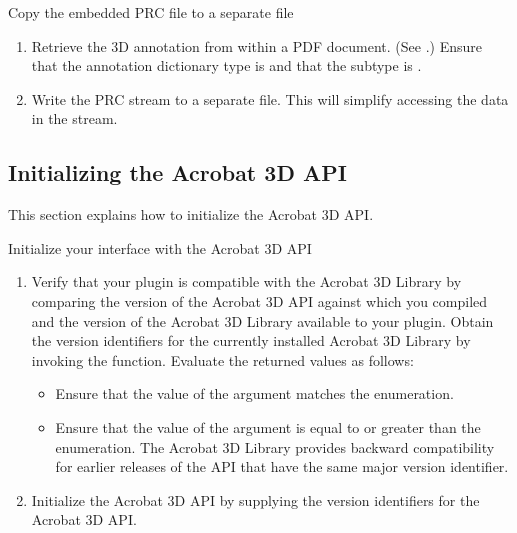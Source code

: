 \documentclass[letterpaper,12pt,english,openany,oneside]{sphinxmanual}
\begin{document}
Copy the embedded PRC file to a separate file
\begin{enumerate}
%
\item {} 
Retrieve the 3D annotation from within a PDF document. (See .) Ensure that the annotation dictionary type is  and that the subtype is .

\item {} 
Write the PRC stream to a separate file. This will simplify accessing the data in the stream.

\end{enumerate}


\subsection{Initializing the Acrobat 3D API}
\label{\detokenize{Plugins_A3D_API:initializing-the-acrobat-3d-api}}
This section explains how to initialize the Acrobat 3D API.

Initialize your interface with the Acrobat 3D API
\begin{enumerate}
%
\item {} 
Verify that your plugin is compatible with the Acrobat 3D Library by comparing the version of the Acrobat 3D API against which you compiled and the version of the Acrobat 3D Library available to your plugin. Obtain the version identifiers for the currently installed Acrobat 3D Library by invoking the  function. Evaluate the returned values as follows:
\begin{itemize}
\item {} 
Ensure that the value of the  argument matches the  enumeration.

\item {} 
Ensure that the value of the  argument is equal to or greater than the  enumeration. The Acrobat 3D Library provides backward compatibility for earlier releases of the API that have the same major version identifier.

\end{itemize}

\item {} 
Initialize the Acrobat 3D API by supplying the version identifiers for the Acrobat 3D API.

\end{enumerate}
\end{document}
